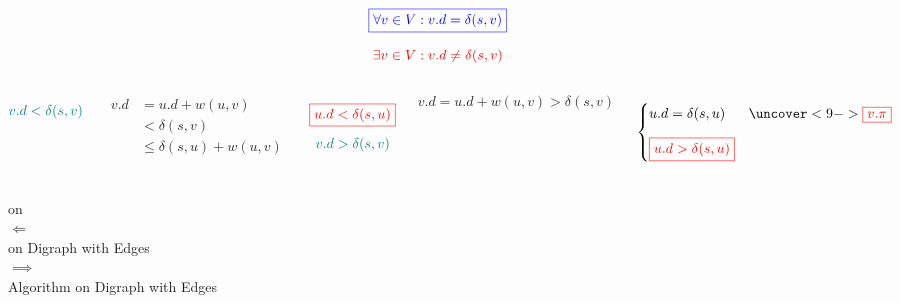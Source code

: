 \begin{frame}{}
  \[
    \textcolor{blue}{\boxed{\forall v \in V: v.d = \delta(s, v)}}
  \]
  
  \pause
  \[
    \textcolor{red}{\exists v \in V: v.d \neq \delta(s, v)}
  \]
  
  \pause
  \begin{columns}
      \[
        \textcolor{teal}{v.d < \delta(s, v)}
      \]
      
      \pause
      \begin{align*}
        v.d &= u.d + w(u,v) \\
            &< \delta(s ,v) \\
            &\le \delta(s, u) + w(u,v)
      \end{align*}
      
      \pause
      \[
        \textcolor{red}{\boxed{u.d < \delta(s, u)}}
      \]
      \pause
      \[
        \textcolor{teal}{v.d > \delta(s, v)}
      \]
      
      \pause
      \[
        v.d = u.d + w(u,v) > \delta(s,v)
      \]
      
      \pause
      \[
        \begin{cases}
          u.d = \delta(s, u) & \uncover<9->{\red{\boxed{v.\pi}}} \\[10pt]
          \red{\boxed{u.d > \delta(s, u)}}
        \end{cases}
      \]
  \end{columns}
\end{frame}

\begin{frame}{}
  \begin{center}
     on  \\[6pt]
    $\Longleftarrow$ \\[30pt]

     on Digraph with  Edges \\[30pt]
    
    $\implies$ \\[6pt]
     Algorithm on Digraph with  Edges
  \end{center}
\end{frame}
